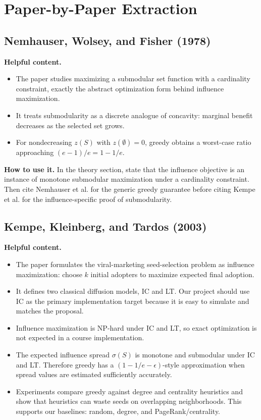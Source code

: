 \documentclass[10pt]{article}
\begin{document}
\section{Paper-by-Paper Extraction}

\subsection{Nemhauser, Wolsey, and Fisher (1978)}

\textbf{Helpful content.}
\begin{itemize}
\item The paper studies maximizing a submodular set function with a cardinality
constraint, exactly the abstract optimization form behind influence maximization.
\item It treats submodularity as a discrete analogue of concavity: marginal
benefit decreases as the selected set grows.
\item For nondecreasing $z(S)$ with $z(\emptyset)=0$, greedy obtains a worst-case
ratio approaching $(e-1)/e=1-1/e$.
\end{itemize}

\textbf{How to use it.} In the theory section, state that the influence objective
is an instance of monotone submodular maximization under a cardinality
constraint. Then cite Nemhauser et al. for the generic greedy guarantee before
citing Kempe et al. for the influence-specific proof of submodularity.

\subsection{Kempe, Kleinberg, and Tardos (2003)}

\textbf{Helpful content.}
\begin{itemize}
\item The paper formulates the viral-marketing seed-selection problem as
influence maximization: choose $k$ initial adopters to maximize expected final
adoption.
\item It defines two classical diffusion models, IC and LT. Our project should
use IC as the primary implementation target because it is easy to simulate and
matches the proposal.
\item Influence maximization is NP-hard under IC and LT, so exact optimization
is not expected in a course implementation.
\item The expected influence spread $\sigma(S)$ is monotone and submodular under
IC and LT. Therefore greedy has a $(1-1/e-\epsilon)$-style approximation when
spread values are estimated sufficiently accurately.
\item Experiments compare greedy against degree and centrality heuristics and
show that heuristics can waste seeds on overlapping neighborhoods. This supports
our baselines: random, degree, and PageRank/centrality.
\end{itemize}
\end{document}
